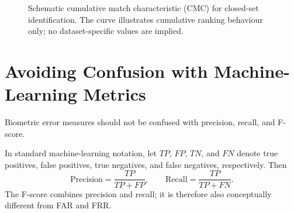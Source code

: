 \documentclass[11pt,a4paper,oneside]{report}
\newif\ifTikZAvailable
\begin{document}
\begin{figure}[htbp]
\centering

\ifTikZAvailable

\begin{tikzpicture}[x=1.08cm,y=5.5cm]
%
    \draw[
        ->,
        line width=0.75pt
    ]
    (0,0)
    --
    (10.0,0)
    node[right]{
        \small rank \(k\)
    };
%
    \draw[
        ->,
        line width=0.75pt
    ]
    (0,0)
    --
    (0,1.08)
    node[above]{
        \small CMS
    };
%
    \draw[
        SapienzaRed,
        line width=1.1pt
    ]
    plot[smooth] coordinates {
        (1,0.48)
        (2,0.63)
        (3,0.73)
        (4,0.81)
        (5,0.87)
        (6,0.91)
        (7,0.95)
        (8,0.975)
        (9,0.99)
    };
%
    \foreach \x in {1,...,9}{
        \draw
        (\x,0.012)
        --
        (\x,-0.012)
        node[below=2pt]{
            \scriptsize \x
        };
    }
%
    \fill[
        SapienzaRed
    ]
    (1,0.48)
    circle
    (1.7pt);
%
    \node[
        above right
    ]
    at (1,0.48) {
        \small RR = CMS@1
    };
%
\end{tikzpicture}

\else


\fi

\caption{
Schematic cumulative match characteristic (CMC)
for closed-set identification.
The curve illustrates cumulative ranking behaviour only;
no dataset-specific values are implied.
}
\label{fig:cmc}

\end{figure}

\Needspace{6cm}
\section{Avoiding Confusion with Machine-Learning Metrics}
\label{subsec:ml-confusion}

Biometric error measures should not be confused with precision, recall, and F-score.

In standard machine-learning notation, let \(TP\), \(FP\), \(TN\), and
\(FN\) denote true positives, false positives, true negatives, and false
negatives, respectively. Then
\begin{equation}
\mathrm{Precision}
=
\frac{TP}{TP+FP},
\qquad
\mathrm{Recall}
=
\frac{TP}{TP+FN}.
\label{eq:precision-recall}
\end{equation}
The F-score combines precision and recall; it is therefore also conceptually
different from FAR and FRR.
\end{document}
